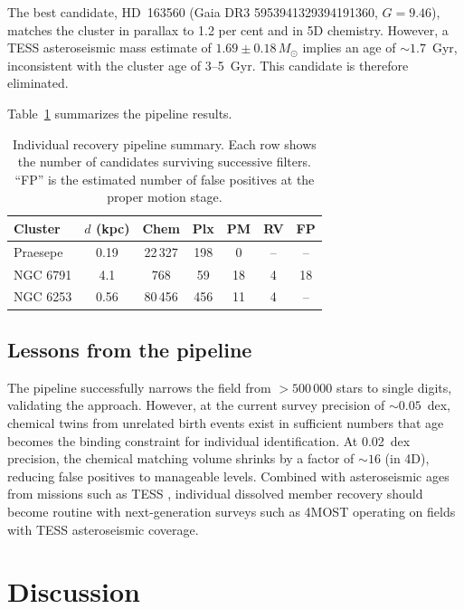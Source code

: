 \documentclass[fleqn,usenatbib]{mnras}
\begin{document}
The best candidate, HD~163560 (Gaia DR3 5953941329394191360, $G = 9.46$), matches the cluster in parallax to 1.2 per cent and in 5D chemistry.
However, a TESS asteroseismic mass estimate of $1.69 \pm 0.18\,M_\odot$ \citep[following the methods of][]{Hon2021} implies an age of ${\sim}1.7$~Gyr, inconsistent with the cluster age of 3--5~Gyr.
This candidate is therefore eliminated.

Table~\ref{tab:pipeline} summarizes the pipeline results.

\begin{table}
\centering
\caption{Individual recovery pipeline summary. Each row shows the number of candidates surviving successive filters. ``FP'' is the estimated number of false positives at the proper motion stage.}
\label{tab:pipeline}
\begin{tabular}{lcccccc}
\toprule
Cluster & $d$ (kpc) & Chem & Plx & PM & RV & FP \\
\midrule
Praesepe   & 0.19 & 22\,327 & 198 & 0  & -- & -- \\
NGC 6791   & 4.1  & 768     & 59  & 18 & 4  & 18 \\
NGC 6253   & 0.56 & 80\,456 & 456 & 11 & 4  & -- \\
\bottomrule
\end{tabular}
\end{table}

\subsection{Lessons from the pipeline}

The pipeline successfully narrows the field from $> 500\,000$ stars to single digits, validating the approach.
However, at the current survey precision of ${\sim}0.05$~dex, chemical twins from unrelated birth events exist in sufficient numbers that age becomes the binding constraint for individual identification.
At 0.02~dex precision, the chemical matching volume shrinks by a factor of ${\sim}16$ (in 4D), reducing false positives to manageable levels.
Combined with asteroseismic ages from missions such as TESS \citep{Ricker2015, Hon2021}, individual dissolved member recovery should become routine with next-generation surveys such as 4MOST operating on fields with TESS asteroseismic coverage.


\section{Discussion}
\label{sec:discussion}
\end{document}
